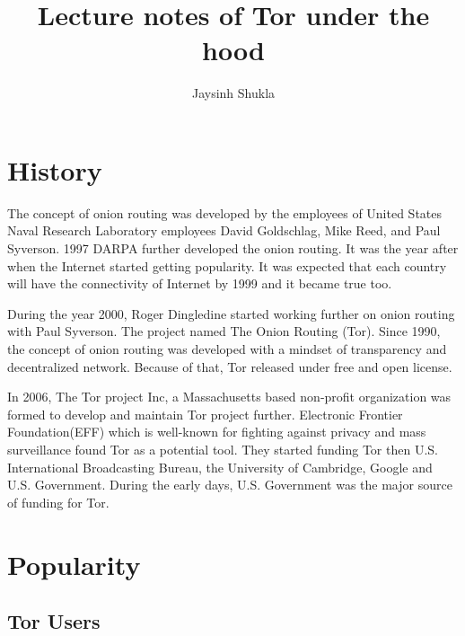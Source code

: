 \documentclass{article}
\title{Lecture notes of Tor under the hood}
\author{Jaysinh Shukla}
\begin{document}
\maketitle

\section{History}

  The concept of onion routing was developed by the employees of United States
  Naval Research Laboratory employees David Goldschlag, Mike Reed, and Paul
  Syverson. 1997 DARPA further developed the onion routing.
  \cite{history_of_tor} It was the year after when the Internet started getting
  popularity.  It was expected that each country will have the connectivity of
  Internet by 1999 and it became true too.  \cite{digitalrevolution}

  During the year 2000, Roger Dingledine started working further on onion
  routing with Paul Syverson. The project named The Onion Routing (Tor). Since
  1990, the concept of onion routing was developed with a mindset of
  transparency and decentralized network. Because of that, Tor released under
  free and open license.

  In 2006, The Tor project Inc, a Massachusetts based non-profit organization
  was formed to develop and maintain Tor project further. Electronic Frontier
  Foundation(EFF) which is well-known for fighting against privacy and mass
  surveillance found Tor as a potential tool. They started funding Tor then
  U.S.  International Broadcasting Bureau, the University of Cambridge, Google
  and U.S. Government. During the early days, U.S. Government was the major
  source of funding for Tor.

\section{Popularity}

  \subsection{Tor Users}
\end{document}
